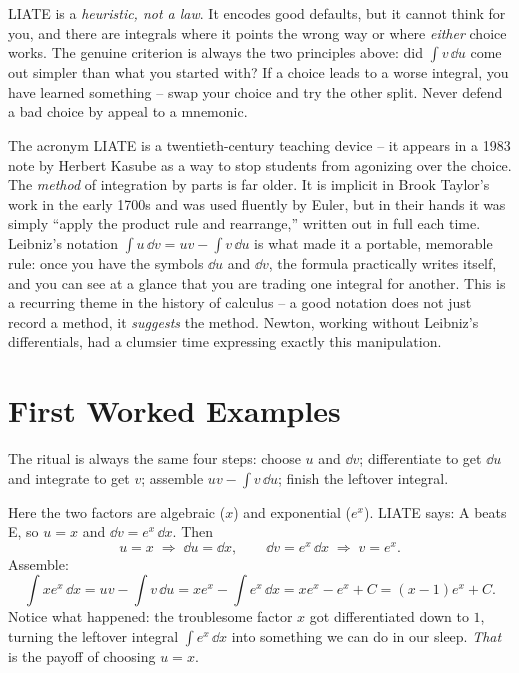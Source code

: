 \begin{trapbox}
LIATE is a \emph{heuristic, not a law}. It encodes good defaults, but it cannot
think for you, and there are integrals where it points the wrong way or where
\emph{either} choice works. The genuine criterion is always the two principles
above: did $\int v\,\dd u$ come out simpler than what you started with? If a
choice leads to a worse integral, you have learned something -- swap your choice
and try the other split. Never defend a bad choice by appeal to a mnemonic.
\end{trapbox}

\begin{historybox}
The acronym LIATE is a twentieth-century teaching device -- it appears in a 1983
note by Herbert Kasube as a way to stop students from agonizing over the choice.
The \emph{method} of integration by parts is far older. It is implicit in
Brook Taylor's work in the early 1700s and was used fluently by Euler, but in
their hands it was simply ``apply the product rule and rearrange,'' written out
in full each time. Leibniz's notation $\int u\,\dd v = uv - \int v\,\dd u$ is what
made it a portable, memorable rule: once you have the symbols $\dd u$ and $\dd v$,
the formula practically writes itself, and you can see at a glance that you are
trading one integral for another. This is a recurring theme in the history of
calculus -- a good notation does not just record a method, it \emph{suggests} the
method. Newton, working without Leibniz's differentials, had a clumsier time
expressing exactly this manipulation.
\end{historybox}

\section{First Worked Examples}
\label{ch23:examples}

The ritual is always the same four steps: choose $u$ and $\dd v$; differentiate
to get $\dd u$ and integrate to get $v$; assemble $uv - \int v\,\dd u$; finish
the leftover integral.

\begin{example}
\label{ch23:ex-xex}
Here the two factors are algebraic ($x$) and exponential ($e^x$). LIATE says: A
beats E, so $u=x$ and $\dd v = e^x\,\dd x$. Then
\[
u = x \;\Rightarrow\; \dd u = \dd x, \qquad
\dd v = e^x\,\dd x \;\Rightarrow\; v = e^x.
\]
Assemble:
\[
\int x e^{x}\,\dd x = uv - \int v\,\dd u = x e^{x} - \int e^{x}\,\dd x
= x e^{x} - e^{x} + C = (x-1)e^{x} + C.
\]
Notice what happened: the troublesome factor $x$ got differentiated down to $1$,
turning the leftover integral $\int e^x\,\dd x$ into something we can do in our
sleep. \emph{That} is the payoff of choosing $u=x$.
\end{example}

